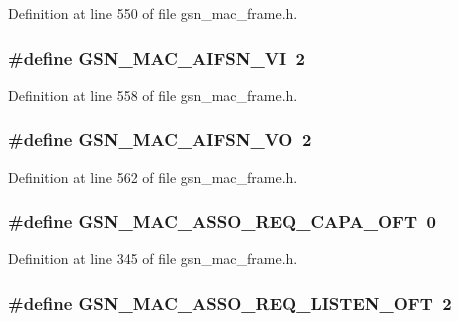Definition at line 550 of file gsn\_\-mac\_\-frame.h.

\hypertarget{a00523_a886e3b51467823185c2a139c485fc881}{
\subsubsection[{GSN\_\-MAC\_\-AIFSN\_\-VI}]{\setlength{\rightskip}{0pt plus 5cm}\#define GSN\_\-MAC\_\-AIFSN\_\-VI~2}}
\label{a00523_a886e3b51467823185c2a139c485fc881}


Definition at line 558 of file gsn\_\-mac\_\-frame.h.

\hypertarget{a00523_a3f460be3718f0d84eab49e97e9a13e0c}{
\subsubsection[{GSN\_\-MAC\_\-AIFSN\_\-VO}]{\setlength{\rightskip}{0pt plus 5cm}\#define GSN\_\-MAC\_\-AIFSN\_\-VO~2}}
\label{a00523_a3f460be3718f0d84eab49e97e9a13e0c}


Definition at line 562 of file gsn\_\-mac\_\-frame.h.

\hypertarget{a00523_a74882f14ee8974ebd605e01932af1c27}{
\subsubsection[{GSN\_\-MAC\_\-ASSO\_\-REQ\_\-CAPA\_\-OFT}]{\setlength{\rightskip}{0pt plus 5cm}\#define GSN\_\-MAC\_\-ASSO\_\-REQ\_\-CAPA\_\-OFT~0}}
\label{a00523_a74882f14ee8974ebd605e01932af1c27}


Definition at line 345 of file gsn\_\-mac\_\-frame.h.

\hypertarget{a00523_acfc5a44b92d1e1509ec7cc62f871edb5}{
\subsubsection[{GSN\_\-MAC\_\-ASSO\_\-REQ\_\-LISTEN\_\-OFT}]{\setlength{\rightskip}{0pt plus 5cm}\#define GSN\_\-MAC\_\-ASSO\_\-REQ\_\-LISTEN\_\-OFT~2}}
\label{a00523_acfc5a44b92d1e1509ec7cc62f871edb5}


